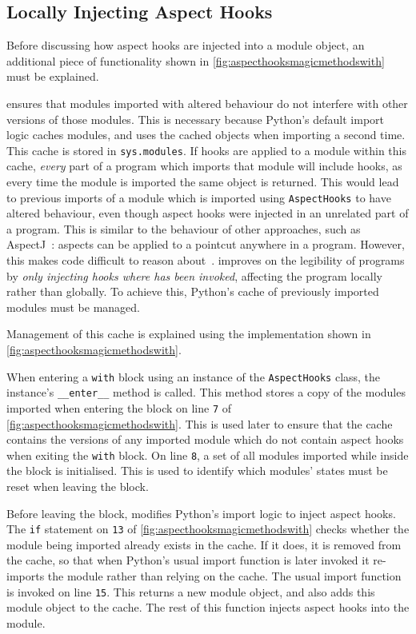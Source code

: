 \subsection{Locally Injecting Aspect Hooks}

Before discussing how aspect hooks are injected into a module object, an
additional piece of functionality shown in
\cref{fig:aspecthooksmagicmethodswith} must be explained.

\pdsf{} ensures that modules imported with altered behaviour do not interfere
with other versions of those modules. This is necessary because Python's default
import logic caches modules, and uses the cached objects when importing a second
time. This cache is stored in \lstinline{sys.modules}. If hooks are applied to a
module within this cache, \emph{every} part of a program which imports that
module will include hooks, as every time the module is imported the same object
is returned. This would lead to previous imports of a module which is imported
using \lstinline{AspectHooks} to have altered behaviour, even though aspect
hooks were injected in an unrelated part of a program. This is similar to the
behaviour of other \aop{} approaches, such as
AspectJ~\cite{AspectJLanguageAndTools}: aspects can be applied to a pointcut
anywhere in a program. However, this makes code difficult to reason
about~\cite{steimann06paradoxical,przybylek2010wrong}. \pdsf{} improves on the
legibility of \aspectoriented programs by \emph{only injecting hooks where
\pdsf{} has been invoked}, affecting the program locally rather than globally.
To achieve this, Python's cache of previously imported modules must be managed.

Management of this cache is explained using the implementation shown in
\cref{fig:aspecthooksmagicmethodswith}.

When entering a \lstinline{with} block using an instance of the
\lstinline{AspectHooks} class, the instance's \lstinline{__enter__} method is
called. This method stores a copy of the modules imported when entering the
block on line \texttt{7} of \cref{fig:aspecthooksmagicmethodswith}. This is used
later to ensure that the cache contains the versions of any imported module
which do not contain aspect hooks when exiting the \lstinline{with} block. On
line \texttt{8}, a set of all modules imported while inside the block is
initialised. This is used to identify which modules' states must be reset when
leaving the block.

Before leaving the block, \pdsf{} modifies Python's import logic to inject
aspect hooks. The \lstinline{if} statement on \texttt{13} of
\cref{fig:aspecthooksmagicmethodswith} checks whether the module being imported
already exists in the cache. If it does, it is removed from the cache, so that
when Python's usual import function is later invoked it re-imports the module
rather than relying on the cache. The usual import function is invoked on line
\texttt{15}. This returns a new module object, and also adds this module object
to the cache. The rest of this function injects aspect hooks into the module.

